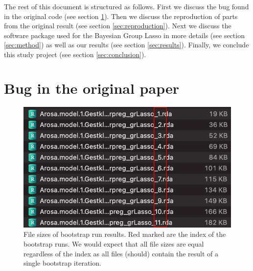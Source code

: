 \documentclass[twoside,twocolumn]{article}
\begin{document}
The rest of this document is structured as follows. First we discuss the bug found in the original code (see section \ref{sec:bug}).
Then we discuss the reproduction of parts from the original result (see section \ref{sec:reproduction}).
Next we discuss the software package used for the Bayesian Group Lasso in more details (see section \ref{sec:method}) as well as our results (see section \ref{sec:results}).
Finally, we conclude this study project (see section \ref{sec:conclusion}).


\section{Bug in the original paper} \label{sec:bug}

\begin{figure}
    \centering
  \includegraphics[width=\linewidth]{orig_filesize}
  \caption{File sizes of bootstrap run results. Red marked are the index of the bootstrap runs. We would expect that all file sizes are equal regardless of the index as all files (should) contain the result of a single bootstrap iteration.}
  \label{fig:bug_evidence}
\end{figure}
\end{document}
